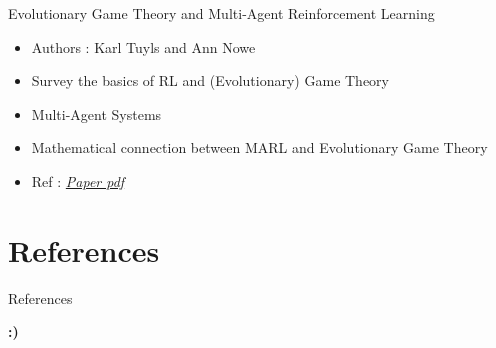 \documentclass{IFES-beamer}
\begin{document}
    \begin{frame}{Evolutionary Game Theory and Multi-Agent Reinforcement Learning}
    \begin{itemize}
        \item Authors :  Karl Tuyls and Ann Nowe
        \item Survey the basics of RL and (Evolutionary) Game Theory
        \item Multi-Agent Systems
        \item Mathematical connection between MARL and Evolutionary Game Theory
        \item Ref : \href{https://pdfs.semanticscholar.org/bb9f/bee22eae2b47bbf304804a6ac07def1aecdb.pdf}{\emph{Paper pdf}}
    \end{itemize}
    \end{frame}

    
\section{References}
    \nocite{DBLP:books/lib/SuttonB98, Barker2017}
    \begin{frame}{References}
        \printbibliography
    \end{frame}

    \begin{frame}{ }
        \begin{center}
            \Huge{
            \textbf{:)}}
        \end{center}
        
    \end{frame}
\end{document}
